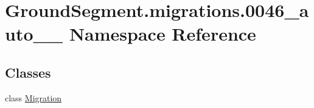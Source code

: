 \hypertarget{namespace_ground_segment_1_1migrations_1_10046__auto__20170207__1208}{}\section{Ground\+Segment.\+migrations.0046\+\_\+auto\+\_\+\_ Namespace Reference}
\label{namespace_ground_segment_1_1migrations_1_10046__auto__20170207__1208}
\subsection*{Classes}
\begin{DoxyCompactItemize}
\item 
class \hyperlink{class_ground_segment_1_1migrations_1_10046__auto__20170207__1208_1_1_migration}{Migration}
\end{DoxyCompactItemize}
